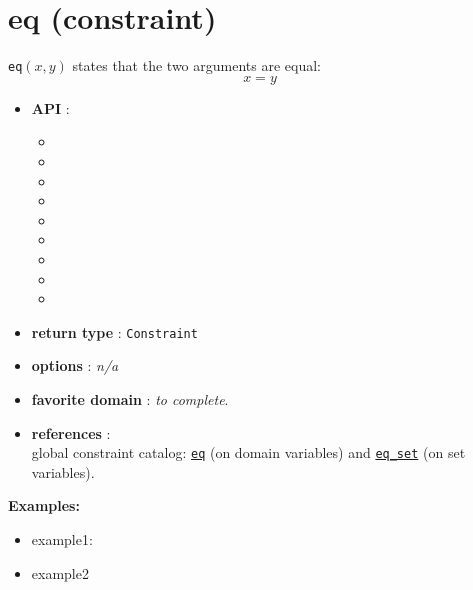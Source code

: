 \label{eq}
\hypertarget{eq}{}

\section{eq (constraint)}\label{eq:eqconstraint}\hypertarget{eq:eqconstraint}{}
\begin{notedef}
  \texttt{eq}$(x,y)$ states that the two arguments are equal:
$$x = y$$
\end{notedef}

\begin{itemize}
	\item \textbf{API} :
	\begin{itemize}
		\item {}
		\item {}
		\item {}
		\item {}
		\item {}
		\item {}
		\item {}
		\item {}
		\item {}
	\end{itemize}
	\item \textbf{return type} : \texttt{Constraint}
	\item \textbf{options} : \emph{n/a}
	\item \textbf{favorite domain} : \emph{to complete}.
	\item \textbf{references} :\\
      global constraint catalog: \href{http://www.emn.fr/x-info/sdemasse/gccat/Ceq.html}{\tt eq} (on domain variables) and \href{http://www.emn.fr/x-info/sdemasse/gccat/Ceq_set.html}{\tt eq\_set} (on set variables). 
\end{itemize}

\textbf{Examples:}
\begin{itemize}
	\item example1:
\end{itemize}

\begin{itemize}
	\item example2
\end{itemize}


